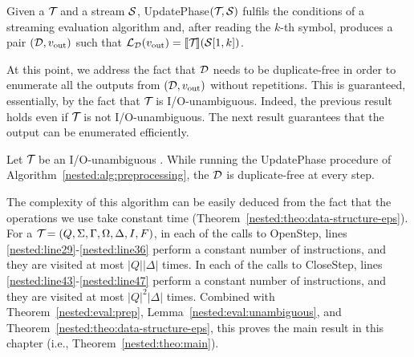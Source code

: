 
\begin{theorem}\label{nested:eval:prep}
	Given a \vpann $\mathcal{T}\!$ and a stream $\mathcal{S}$, {\sc UpdatePhase}$(\mathcal{T}\!, \mathcal{S})$ fulfils the conditions of a streaming evaluation algorithm and, after reading the $k$-th symbol, produces a pair $(\mathcal{D},v_{\operatorname{out}})$ such that $\mathcal{L}_{\mathcal{D}}(v_{\operatorname{out}}) = {\llbracket{\mathcal{T}\!}\rrbracket}(\mathcal{S}[1,k])$.
\end{theorem}

At this point, we address the fact that $\mathcal{D}$ needs to be duplicate-free in order to enumerate all the outputs from $(\mathcal{D},v_{\text{out}})$ without repetitions.
This is guaranteed, essentially, by the fact that $\mathcal{T}\!$ is I/O-unambiguous.
Indeed, the previous result holds even if $\mathcal{T}\!$ is not I/O-unambiguous.
The next result guarantees that the output can be enumerated efficiently.

\begin{lemma}\label{nested:eval:unambiguous}
	Let $\mathcal{T}\!$ be an I/O-unambiguous \vpann. While running the {\sc UpdatePhase} procedure of Algorithm~\ref{nested:alg:preprocessing}, the \dsepsabbr $\mathcal{D}$ is duplicate-free at every step.
\end{lemma}




The complexity of this algorithm can be easily deduced from the fact that the \dsepsabbr operations we use take constant time (Theorem~\ref{nested:theo:data-structure-eps}). For a \vpann $\mathcal{T}\! = (Q, \Sigma, \Gamma, \Omega, \Delta, I, F)$, in each of the calls to {\sc OpenStep}, lines \ref{nested:line29}-\ref{nested:line36} perform a constant number of instructions, and they are visited at most $\vert Q\vert\vert\Delta\vert$ times. In each of the calls to {\sc CloseStep}, lines \ref{nested:line43}-\ref{nested:line47} perform a constant number of instructions, and they are visited at most $\vert Q\vert^2\vert\Delta\vert$ times. 
Combined with Theorem~\ref{nested:eval:prep}, Lemma~\ref{nested:eval:unambiguous}, and Theorem~\ref{nested:theo:data-structure-eps}, this proves the main result in this chapter (i.e., Theorem~\ref{nested:theo:main}).


